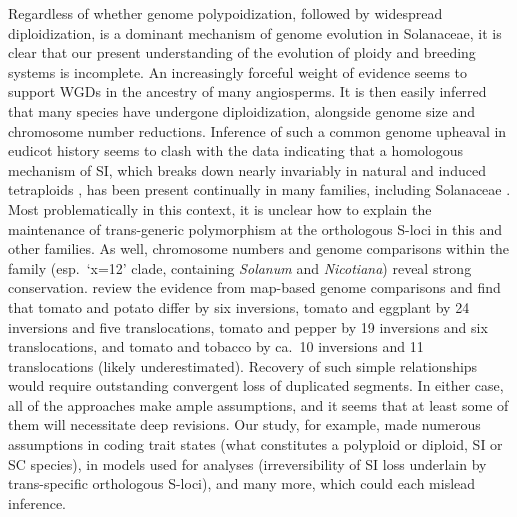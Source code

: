 Regardless of whether genome polypoidization, followed by widespread diploidization, is a dominant mechanism of genome evolution in Solanaceae, it is clear that our present understanding of the evolution of ploidy and breeding systems is incomplete.
An increasingly forceful weight of evidence seems to support WGDs in the ancestry of many angiosperms. %
It is then easily inferred that many species have undergone diploidization, alongside genome size and chromosome number reductions. %
Inference of such a common genome upheaval in eudicot history seems to clash with the data indicating that a homologous mechanism of SI, which breaks down nearly invariably in natural and induced tetraploids \citep{stone_2002,mcclure_2009}, has been present continually in many families, including Solanaceae \citep{igic_2006}. 
Most problematically in this context, it is unclear how to explain the maintenance of trans-generic polymorphism at the orthologous S-loci in this and other families.
As well, chromosome numbers and genome comparisons within the family (esp.\ `x=12' clade, containing \textit{Solanum} and \textit{Nicotiana}) reveal strong conservation.
\citet{wu_2010a} review the evidence from map-based genome comparisons and find that tomato and potato differ by six inversions, tomato and eggplant by 24 inversions and five translocations, tomato and pepper by 19 inversions and six translocations, and tomato and tobacco by ca.\ 10 inversions and 11 translocations (likely underestimated).
Recovery of such simple relationships would require outstanding convergent loss of duplicated segments.
In either case, all of the approaches make ample assumptions, and it seems that at least some of them will necessitate deep revisions.
Our study, for example, made numerous assumptions in coding trait states (\eg what constitutes a polyploid or diploid, SI or SC species), in models used for analyses (\eg irreversibility of SI loss underlain by trans-specific orthologous S-loci), and many more, which could each mislead inference. %

\bigskip

